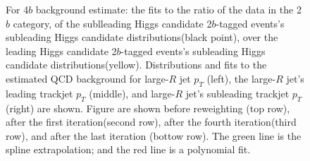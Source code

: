 \begin{figure}[htbp!]
\begin{center}
\caption{For 4$b$ background estimate: the fits to the ratio of the data in the 2$b$ category, of the sublleading Higgs candidate 2$b$-tagged events's subleading Higgs candidate distributions(black point), over the leading Higgs candidate 2$b$-tagged events's subleading Higgs candidate distributions(yellow). Distributions and fits to the estimated QCD background for large-$R$ jet $p_{T}$ (left),  the large-$R$ jet's leading trackjet $p_T$ (middle), and large-$R$ jet's subleading trackjet $p_T$ (right) are shown.  Figure are shown before reweighting (top row), after the first iteration(second row), after the fourth iteration(third row), and after the last iteration (bottow row). The green line is the spline extrapolation; and the red line is a polynomial fit.}
\label{fig:rw-4b-lead}
\end{center}
\end{figure}

